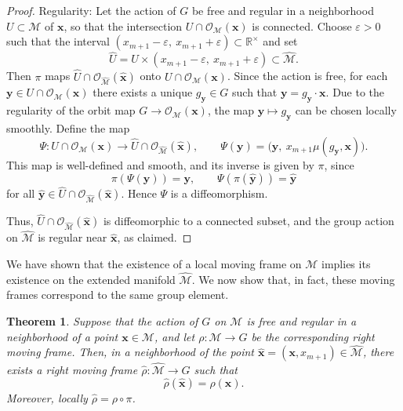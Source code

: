 \documentclass[12pt,reqno]{amsart}
\newtheorem{theorem}{Theorem}
\begin{document}
\begin{proof}
\medskip

Regularity: Let the action of $G$ be free and regular in a neighborhood $U \subset \mathcal M$ of $\boldsymbol x$, so that the intersection $U \cap \mathcal O_{\mathcal M}(\boldsymbol x)$ is connected.
Choose $\varepsilon > 0$ such that the interval $(x_{m+1} - \varepsilon,\ x_{m+1} + \varepsilon) \subset \mathbb{R}^\times$ and set
\[
\widehat U = U \times (x_{m+1} - \varepsilon,\ x_{m+1} + \varepsilon) \subset \widehat{\mathcal M}.
\]
Then $\pi$ maps $\widehat U \cap \mathcal O_{\widehat{\mathcal M}}(\boldsymbol{\hat x})$ onto $U \cap \mathcal O_{\mathcal M}(\boldsymbol x)$.
Since the action is free, for each $\boldsymbol y \in U \cap \mathcal O_{\mathcal M}(\boldsymbol x)$ there exists a unique $g_{\boldsymbol y} \in G$ such that $\boldsymbol y = g_{\boldsymbol y} \cdot \boldsymbol x$. Due to the regularity of the orbit map $G \to \mathcal O_{\mathcal M}(\boldsymbol x)$, the map $\boldsymbol y \mapsto g_{\boldsymbol y}$ can be chosen locally smoothly. Define the map
\[
\Psi : U \cap \mathcal O_{\mathcal M}(\boldsymbol x) \longrightarrow \widehat U \cap \mathcal O_{\widehat{\mathcal M}}(\boldsymbol{\hat x}), \qquad
\Psi(\boldsymbol y) = \bigl(\boldsymbol y,\ x_{m+1} \mu(g_{\boldsymbol y}, \boldsymbol x)\bigr).
\]
This map is well-defined and smooth, and its inverse is given by $\pi$, since
\[
\pi(\Psi(\boldsymbol y)) = \boldsymbol y, \qquad \Psi(\pi(\boldsymbol{\hat y})) = \boldsymbol{\hat y}
\]
for all $\boldsymbol{\hat y} \in \widehat U \cap \mathcal O_{\widehat{\mathcal M}}(\boldsymbol{\hat x})$.
Hence $\Psi$ is a diffeomorphism.

Thus, $\widehat U \cap \mathcal O_{\widehat{\mathcal M}}(\boldsymbol{\hat x})$ is diffeomorphic to a connected subset, and the group action on $\widehat{\mathcal M}$ is regular near $\boldsymbol{\hat x}$, as claimed.
\end{proof}


\medskip
We have shown that the existence of a local moving frame on $\mathcal M$ implies its existence on the
extended manifold $\widehat{\mathcal M}$. We now show that, in fact, these moving frames correspond to
the same group element.

\begin{theorem}\label{rho}
Suppose that the action of $G$ on $\mathcal M$ is free and regular in a neighborhood of a point
$\boldsymbol x \in \mathcal M$, and let $\rho : \mathcal M \to G$ be the corresponding right moving frame.
Then, in a neighborhood of the point $\boldsymbol{\hat x} = (\boldsymbol x, x_{m+1}) \in \widehat{\mathcal M}$,
there exists a right moving frame $\widehat{\rho} : \widehat{\mathcal M} \to G$ such that
\[
\widehat{\rho}(\boldsymbol{\hat x}) = \rho(\boldsymbol x).
\]
Moreover, locally $\widehat{\rho} = \rho \circ \pi$.
\end{theorem}
\end{document}
